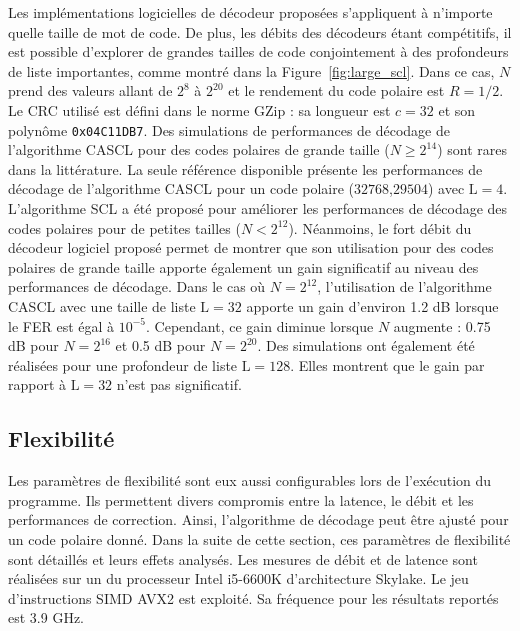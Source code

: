 Les implémentations logicielles de décodeur proposées s'appliquent à n'importe quelle taille de mot de code. De plus, les débits des décodeurs étant compétitifs, il est possible d'explorer de grandes tailles de code conjointement à des profondeurs de liste importantes, comme montré dans la Figure~\ref{fig:large_scl}. Dans ce cas, $N$ prend des valeurs allant de $2^8$ à $2^{20}$ et le rendement du code polaire est $R=1/2$. Le CRC utilisé est défini dans le norme GZip : sa longueur est $c=32$ et son polynôme \texttt{0x04C11DB7}. 
Des simulations de performances de décodage de l'algorithme CASCL pour des codes polaires de grande taille ($N \geq 2^{14}$) sont rares dans la littérature. La seule référence disponible présente les performances de décodage de l'algorithme CASCL pour un code polaire ($32768$,$29504$) avec $\mathrm{L}=4$.
L'algorithme SCL a été proposé pour améliorer les performances de décodage des codes polaires pour de petites tailles ($N<2^{12}$). Néanmoins, le fort débit du décodeur logiciel proposé permet de montrer que son utilisation pour des codes polaires de grande taille apporte également un gain significatif au niveau des performances de décodage. Dans le cas où $N=2^{12}$, l'utilisation de l'algorithme CASCL avec une taille de liste $\mathrm{L}=32$ apporte un gain d'environ 1.2 dB lorsque le FER est égal à $10^{-5}$. Cependant, ce gain diminue lorsque $N$ augmente : 0.75 dB pour $N=2^{16}$ et 0.5 dB pour $N=2^{20}$. Des simulations ont également été réalisées pour une profondeur de liste $\mathrm{L}=128$. Elles montrent que le gain par rapport à $\mathrm{L}=32$ n'est pas significatif.

\subsection{Flexibilité}
Les paramètres de flexibilité sont eux aussi configurables lors de l'exécution du programme. Ils permettent divers compromis entre la latence, le débit et les performances de correction. Ainsi, l'algorithme de décodage peut être ajusté pour un code polaire donné. Dans la suite de cette section, ces paramètres de flexibilité sont détaillés et leurs effets analysés. Les mesures de débit et de latence sont réalisées sur un \coeur du processeur Intel i5-6600K d'architecture Skylake. Le jeu d'instructions SIMD AVX2 est exploité. Sa fréquence pour les résultats reportés est 3.9 GHz.

